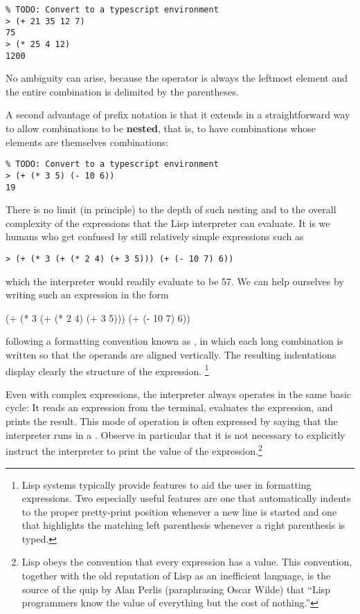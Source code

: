 \begin{verbatim}
% TODO: Convert to a typescript environment
> (+ 21 35 12 7)
75
> (* 25 4 12)
1200
\end{verbatim}

No ambiguity can arise, because the operator is always the leftmost
element and the entire combination is delimited by the parentheses.

A second advantage of prefix notation is that it extends in a
straightforward way to allow combinations to be \textbf{nested}, that
is, to have combinations whose elements are themselves
combinations:

\begin{verbatim}
% TODO: Convert to a typescript environment
> (+ (* 3 5) (- 10 6))
19
\end{verbatim}

There is no limit (in principle) to the depth of such nesting and to
the overall complexity of the expressions that the Lisp interpreter
can evaluate.  It is we humans who get confused by still relatively
simple expressions such as

\begin{verbatim}
> (+ (* 3 (+ (* 2 4) (+ 3 5))) (+ (- 10 7) 6))
\end{verbatim}

\noindent which the interpreter would readily evaluate to be 57.  We can help
ourselves by writing such an expression in the form

\begin{schemedisplay}
(+ (* 3
      (+ (* 2 4)
         (+ 3 5)))
   (+ (- 10 7)
      6))
\end{schemedisplay}

\noindent following a formatting convention known as
, in which each long combination is written so
that the operands are aligned vertically.  The resulting indentations
display clearly the structure of the expression. \footnote{Lisp
  systems typically provide features to aid the user in formatting
  expressions.  Two especially useful features are one that
  automatically indents to the proper pretty-print position whenever a
  new line is started and one that highlights the matching left
  parenthesis whenever a right parenthesis is typed.}

Even with complex expressions, the interpreter always operates in the
same basic cycle: It reads an expression from the terminal, evaluates
the expression, and prints the result.  This mode of operation is
often expressed by saying that the interpreter runs in a
.  Observe in particular that it is not
necessary to explicitly instruct the interpreter to print the value of
the expression.\footnote{Lisp obeys the convention that every
  expression has a value. This convention, together with the old
  reputation of Lisp as an inefficient language, is the source of the
  quip by Alan Perlis (paraphrasing Oscar Wilde) that ``Lisp
  programmers know the value of everything but the cost of nothing.''}

